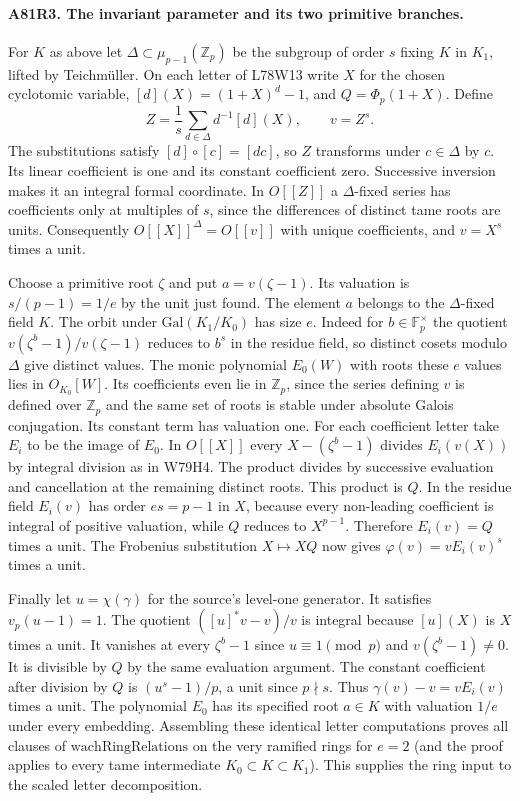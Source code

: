 \paragraph{A81R3. The invariant parameter and its two primitive branches.}
For $K$ as above let $\Delta\subset\mu_{p-1}(\mathbb Z_p)$ be
the subgroup of order $s$ fixing $K$ in $K_1$, lifted by Teichm\"uller.
On each letter of L78W13 write $X$ for the chosen cyclotomic
variable, $[d](X)=(1+X)^d-1$, and $Q=\Phi_p(1+X)$. Define
\[
 Z=\frac1s\sum_{d\in\Delta}d^{-1}[d](X),\qquad v=Z^s.
\]
The substitutions satisfy $[d]\circ[c]=[dc]$, so $Z$ transforms
under $c\in\Delta$ by $c$. Its linear coefficient is one and
its constant coefficient zero. Successive inversion makes it an
integral formal coordinate. In $O[[Z]]$ a $\Delta$-fixed series
has coefficients only at multiples of $s$, since the differences
of distinct tame roots are units. Consequently $O[[X]]^\Delta=O[[v]]$
with unique coefficients, and $v=X^s$ times a unit.

Choose a primitive root $\zeta$ and put $a=v(\zeta-1)$.
Its valuation is $s/(p-1)=1/e$ by the unit just found. The element
$a$ belongs to the $\Delta$-fixed field $K$. The orbit under
$\mathrm{Gal}(K_1/K_0)$ has size $e$. Indeed for
$b\in\mathbb F_p^\times$ the quotient
$v(\zeta^b-1)/v(\zeta-1)$ reduces to $b^s$ in the residue
field, so distinct cosets modulo $\Delta$ give distinct values.
The monic polynomial $E_0(W)$ with roots these $e$ values lies in
$O_{K_0}[W]$. Its coefficients even lie in $\mathbb Z_p$, since
the series defining $v$ is defined over $\mathbb Z_p$ and the
same set of roots is stable under absolute Galois conjugation.
Its constant term has valuation one. For each coefficient letter
take $E_i$ to be the image of $E_0$. In $O[[X]]$ every
$X-(\zeta^b-1)$ divides $E_i(v(X))$ by integral division
as in W79H4. The product divides by successive evaluation and
cancellation at the remaining distinct roots. This product is $Q$.
In the residue field $E_i(v)$ has order $es=p-1$ in $X$,
because every non-leading coefficient is integral of positive
valuation, while $Q$ reduces to $X^{p-1}$. Therefore
$E_i(v)=Q$ times a unit. The Frobenius substitution
$X\mapsto XQ$ now gives $\varphi(v)=v E_i(v)^s$ times a unit.

Finally let $u=\chi(\gamma)$ for the source's level-one generator.
It satisfies $v_p(u-1)=1$. The quotient
$([u]^*v-v)/v$ is integral because $[u](X)$ is $X$ times a unit.
It vanishes at every $\zeta^b-1$ since $u\equiv1\pmod p$ and
$v(\zeta^b-1)\ne0$. It is divisible by $Q$ by the same
evaluation argument. The constant coefficient after division by
$Q$ is $(u^s-1)/p$, a unit since $p\nmid s$. Thus
$\gamma(v)-v=v E_i(v)$ times a unit. The polynomial $E_0$
has its specified root $a\in K$ with valuation $1/e$ under
every embedding. Assembling these identical letter computations
proves all clauses of $\mathrm{wachRingRelations}$ on the very
ramified rings for $e=2$ (and the proof applies to every tame
intermediate $K_0\subset K\subset K_1$). This supplies the ring
input to the scaled letter decomposition.


